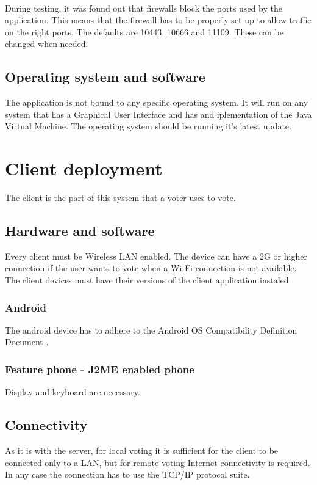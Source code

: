 \documentclass[11pt,twoside,a4paper]{book}
\begin{document}
\\

During testing, it was found out that firewalls block the ports used by the application. This means that the firewall has to be properly set up to allow traffic on the right ports. The defaults are 10443, 10666 and 11109. These can be changed when needed.
\\
\subsection{Operating system and software}
The application is not bound to any specific operating system. It will run on any system that has a Graphical User Interface and has and iplementation of the Java Virtual Machine. The operating system should be running it's latest update.

\section{Client deployment}
The client is the part of this system that a voter uses to vote.
\subsection{Hardware and software}
Every client must be Wireless LAN enabled. The device can have a 2G or higher connection if the user wants to vote when a Wi-Fi connection is not available. The client devices must have their versions of the client application instaled
\subsubsection{Android}
The android device has to adhere to the Android OS Compatibility Definition Document \cite{androCompatDef}.
\subsubsection{Feature phone - J2ME enabled phone}
Display and keyboard are necessary.
\subsection{Connectivity}
As it is with the server, for local voting it is sufficient for the client to be connected only to a LAN, but for remote voting Internet connectivity is required. In any case the connection has to use the TCP/IP protocol suite. 
\end{document}
